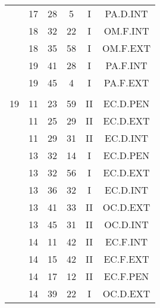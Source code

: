 \documentclass[12pt, a4paper]{article}
\begin{document}
\begin{multicols}{3}
{\begin{tabular}{c c c c c c}
	 	 	 	 & 17 & 28 & 5 & I & PA.D.INT\\%
	 	 	 	 & 18 & 32 & 22 & I & OM.F.INT\\%
	 	 	 	 & 18 & 35 & 58 & I & OM.F.EXT\\%
	 	 	 	 & 19 & 41 & 28 & I & PA.F.INT\\%
	 	 	 	 & 19 & 45 & 4 & I & PA.F.EXT\\%
	 	 	 	 & & & & & \\%
	 	 	 	19 & 11 & 23 & 59 & II & EC.D.PEN\\%
	 	 	 	 & 11 & 25 & 29 & II & EC.D.EXT\\%
	 	 	 	 & 11 & 29 & 31 & II & EC.D.INT\\%
	 	 	 	 & 13 & 32 & 14 & I & EC.D.PEN\\%
	 	 	 	 & 13 & 32 & 56 & I & EC.D.EXT\\%
	 	 	 	 & 13 & 36 & 32 & I & EC.D.INT\\%
	 	 	 	 & 13 & 41 & 33 & II & OC.D.EXT\\%
	 	 	 	 & 13 & 45 & 31 & II & OC.D.INT\\%
	 	 	 	 & 14 & 11 & 42 & II & EC.F.INT\\%
	 	 	 	 & 14 & 15 & 42 & II & EC.F.EXT\\%
	 	 	 	 & 14 & 17 & 12 & II & EC.F.PEN\\%
	 	 	 	 & 14 & 39 & 22 & I & OC.D.EXT\\%
	 	 \end{tabular}
 	}
\end{multicols}
\end{document}
